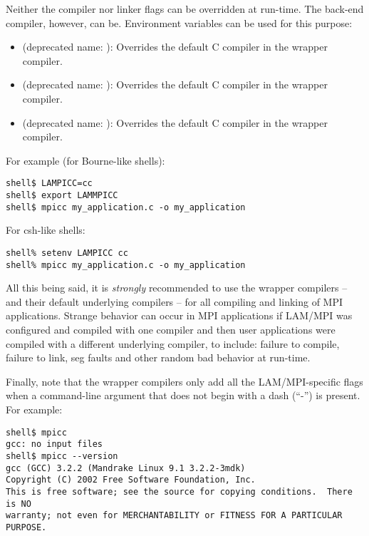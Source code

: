Neither the compiler nor linker flags can be overridden at run-time.
The back-end compiler, however, can be.  Environment variables can be
used for this purpose:

\begin{itemize}
\item {} (deprecated name: ):
  Overrides the default C compiler in the  wrapper
  compiler.
  
\item {} (deprecated name: ):
  Overrides the default C compiler in the  wrapper
  compiler.

\item {} (deprecated name: ):
  Overrides the default C compiler in the  wrapper
  compiler.
\end{itemize}

For example (for Bourne-like shells):

\lstset{style=lam-cmdline}
\begin{lstlisting}
shell$ LAMPICC=cc
shell$ export LAMMPICC
shell$ mpicc my_application.c -o my_application
\end{lstlisting}

For csh-like shells:

\lstset{style=lam-cmdline}
\begin{lstlisting}
shell% setenv LAMPICC cc
shell% mpicc my_application.c -o my_application
\end{lstlisting}

All this being said, it is {\em strongly} recommended to use the
wrapper compilers -- and their default underlying compilers -- for all
compiling and linking of MPI applications.  Strange behavior can occur
in MPI applications if LAM/MPI was configured and compiled with one
compiler and then user applications were compiled with a different
underlying compiler, to include: failure to compile, failure to link,
seg faults and other random bad behavior at run-time.

Finally, note that the wrapper compilers only add all the
LAM/MPI-specific flags when a command-line argument that does not
begin with a dash (``-'') is present.  For example:

\lstset{style=lam-cmdline}
\begin{lstlisting}
shell$ mpicc
gcc: no input files
shell$ mpicc --version
gcc (GCC) 3.2.2 (Mandrake Linux 9.1 3.2.2-3mdk)
Copyright (C) 2002 Free Software Foundation, Inc.
This is free software; see the source for copying conditions.  There is NO
warranty; not even for MERCHANTABILITY or FITNESS FOR A PARTICULAR PURPOSE.
\end{lstlisting}

